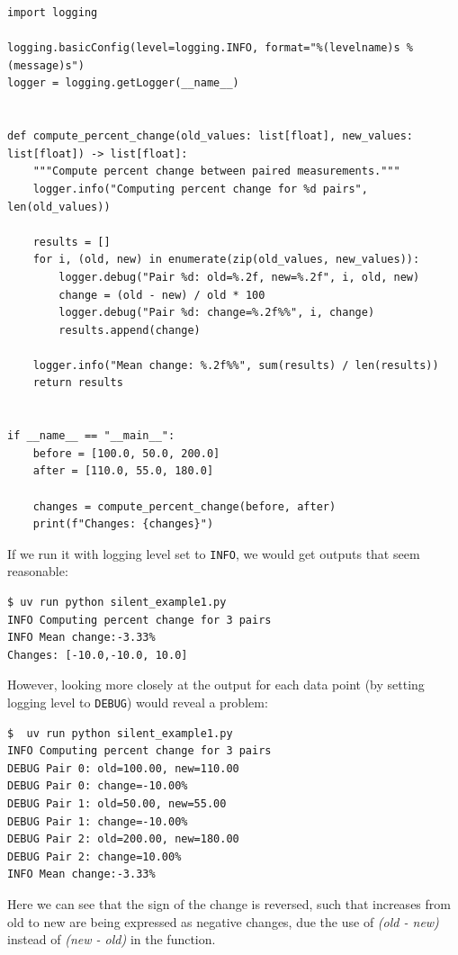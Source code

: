 \begin{lstlisting}[style=Python]
import logging

logging.basicConfig(level=logging.INFO, format="%(levelname)s %(message)s")
logger = logging.getLogger(__name__)


def compute_percent_change(old_values: list[float], new_values: list[float]) -> list[float]:
    """Compute percent change between paired measurements."""
    logger.info("Computing percent change for %d pairs", len(old_values))
    
    results = []
    for i, (old, new) in enumerate(zip(old_values, new_values)):
        logger.debug("Pair %d: old=%.2f, new=%.2f", i, old, new)
        change = (old - new) / old * 100
        logger.debug("Pair %d: change=%.2f%%", i, change)
        results.append(change)
    
    logger.info("Mean change: %.2f%%", sum(results) / len(results))
    return results


if __name__ == "__main__":
    before = [100.0, 50.0, 200.0]
    after = [110.0, 55.0, 180.0]
    
    changes = compute_percent_change(before, after)
    print(f"Changes: {changes}")
\end{lstlisting}

If we run it with logging level set to \texttt{INFO}, we would get outputs that seem reasonable:

\begin{lstlisting}[style=shell, numbers=none]
$ uv run python silent_example1.py
INFO Computing percent change for 3 pairs
INFO Mean change:-3.33%
Changes: [-10.0,-10.0, 10.0]
\end{lstlisting}

However, looking more closely at the output for each data point (by setting logging level to \texttt{DEBUG}) would reveal a problem:

\begin{lstlisting}[style=shell]
$  uv run python silent_example1.py
INFO Computing percent change for 3 pairs
DEBUG Pair 0: old=100.00, new=110.00
DEBUG Pair 0: change=-10.00%
DEBUG Pair 1: old=50.00, new=55.00
DEBUG Pair 1: change=-10.00%
DEBUG Pair 2: old=200.00, new=180.00
DEBUG Pair 2: change=10.00%
INFO Mean change:-3.33%
\end{lstlisting}

Here we can see that the sign of the change is reversed, such that increases from old to new are being expressed as negative changes, due the use of \textit{(old - new)} instead of \textit{(new - old)} in the function.

